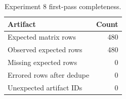 \begin{table}[t]
\centering
\caption{Experiment 8 first-pass completeness.}
\label{tab:exp8-completeness}
\begin{tabular}{lr}
\toprule
Artifact & Count \\
\midrule
Expected matrix rows & 480 \\
Observed expected rows & 480 \\
Missing expected rows & 0 \\
Errored rows after dedupe & 0 \\
Unexpected artifact IDs & 0 \\
\bottomrule
\end{tabular}
\end{table}

